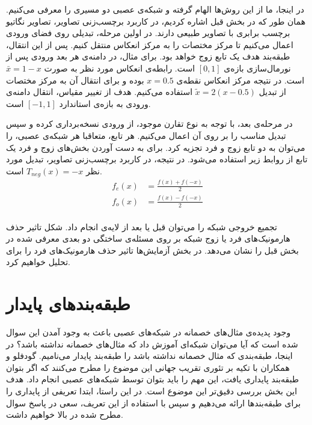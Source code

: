 \documentclass[12pt,onecolumn,a4paper]{article}
\begin{document}
در اینجا، ما از این روش‌ها الهام گرفته و شبکه‌ی عصبی دو مسیری را معرفی می‌کنیم. همان طور که در بخش قبل اشاره کردیم، در کاربرد برچسب‌زنی تصاویر، تصاویر نگاتیو برچسب برابری با تصاویر طبیعی دارند. در اولین مرحله، تبدیلی روی فضای ورودی اعمال می‌کنیم تا مرکز مختصات را به مرکز انعکاس منتقل کنیم. پس از این انتقال، طبقه‌بند هدف یک تابع زوج خواهد بود. برای مثال، در  دامنه‌ی هر بعد ورودی پس از نورمال‌سازی بازه‌ی $[0,1]$ است. رابطه‌ی انعکاس مورد نظر به صورت $\bar{x}=1-x$ است. در نتیجه مرکز انعکاس نقطه‌ی $x=0.5$ بوده و برای انتقال آن به مرکز مختصات از تبدیل $\tilde{x}=2(x-0.5)$ استفاده می‌کنیم. هدف از تغییر مقیاس، انتقال دامنه‌ی ورودی به بازه‌ی استاندارد $[-1,1]$ است.

در مرحله‌ی بعد، با توجه به نوع تقارن موجود، از ورودی نسخه‌برداری کرده و سپس تبدیل مناسب را بر روی آن اعمال می‌کنیم. هر تابع، متعاقبا هر شبکه‌ی عصبی، را می‌توان به دو تابع زوج و فرد تجزیه کرد. برای به دست آوردن بخش‌های زوج و فرد یک تابع از روابط زیر استفاده می‌شود. در نتیجه، در کاربرد برچسب‌زنی تصاویر، تبدیل مورد نظر $T_{neg}(x)=-x$ است.
\begin{align*}
    f_e(x)&=\frac{f(x)+f(-x)}{2}\\
    f_o(x)&=\frac{f(x)-f(-x)}{2}\\
\end{align*}

تجمیع خروجی شبکه را می‌توان قبل یا بعد از لایه‌ی  انجام داد. شکل تاثیر حذف هارمونیک‌های فرد یا زوج شبکه بر روی  مسئله‌ی ساختگی دو بعدی معرفی شده در بخش قبل را نشان می‌دهد. در بخش آزمایش‌ها تاثیر حذف هارمونیک‌های فرد را برای  تحلیل خواهیم کرد.

\section{طبقه‌بند‌های پایدار}
وجود پدیده‌ی مثال‌های خصمانه در شبکه‌های عصبی باعث به وجود آمدن این سوال شده است که آیا می‌توان شبکه‌ای آموزش داد که مثال‌های خصمانه نداشته باشد؟ در اینجا، طبقه‌بندی که مثال خصمانه نداشته باشد را طبقه‌بند پایدار می‌نامیم. گودفلو و همکاران\cite{goodfellow2014explaining} با تکیه بر تئوری تقریب جهانی این موضوع را مطرح می‌کنند که اگر بتوان طبقه‌بند پایداری یافت، این مهم را باید بتوان توسط شبکه‌های عصبی انجام داد. هدف این بخش بررسی دقیق‌تر این موضوع است. در این راستا، ابتدا تعریفی از پایداری را برای طبقه‌بندها ارائه می‌دهیم و سپس با استفاده از این تعریف، سعی در پاسخ سوال مطرح شده در بالا خواهیم داشت.
\end{document}
